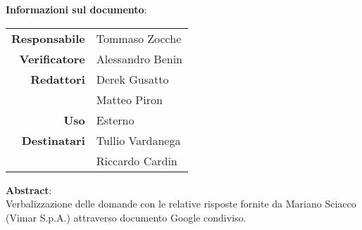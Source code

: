 \begin{center}
\textbf{Informazioni sul documento}: \\
\vspace{0.5cm}

\begin{tabular}{r|l}
    \textbf{Responsabile} & Tommaso Zocche \\ 
    \textbf{Verificatore} &  Alessandro Benin \\ 
    \textbf{Redattori} & Derek Gusatto \\ & Matteo Piron \\ 
    \textbf{Uso} & Esterno \\ 
    \textbf{Destinatari} & Tullio Vardanega \\ & Riccardo Cardin \\ 
\end{tabular}

\vfill

\textbf{Abstract}: \\
\vspace{0.5cm}
Verbalizzazione delle domande con le relative risposte fornite da Mariano Sciacco (Vimar S.p.A.) attraverso documento Google condiviso.
\end{center}


\bigskip